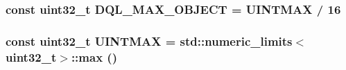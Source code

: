 \subsubsection[{\texorpdfstring{D\+Q\+L\+\_\+\+M\+A\+X\+\_\+\+O\+B\+J\+E\+CT}{DQL_MAX_OBJECT}}]{\setlength{\rightskip}{0pt plus 5cm}const uint32\+\_\+t D\+Q\+L\+\_\+\+M\+A\+X\+\_\+\+O\+B\+J\+E\+CT = {\bf U\+I\+N\+T\+M\+AX} / 16\hspace{0.3cm}{\ttfamily [static]}}\hypertarget{dynamic-queue-limits_8cc_aed676d6549bb66a98d23fc5947d89e7c}{}\label{dynamic-queue-limits_8cc_aed676d6549bb66a98d23fc5947d89e7c}
\subsubsection[{\texorpdfstring{U\+I\+N\+T\+M\+AX}{UINTMAX}}]{\setlength{\rightskip}{0pt plus 5cm}const uint32\+\_\+t U\+I\+N\+T\+M\+AX = std\+::numeric\+\_\+limits$<$uint32\+\_\+t$>$\+::{\bf max} ()\hspace{0.3cm}{\ttfamily [static]}}\hypertarget{dynamic-queue-limits_8cc_a3f63b751e6af68c85a8282699067ba2f}{}\label{dynamic-queue-limits_8cc_a3f63b751e6af68c85a8282699067ba2f}
